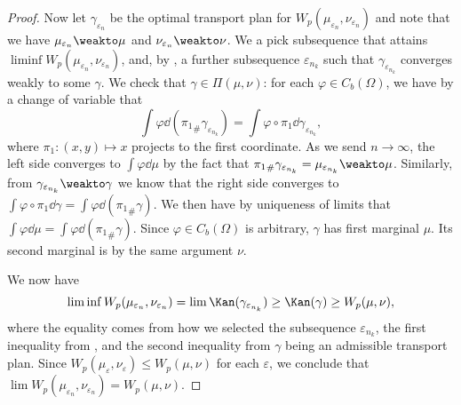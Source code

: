 \documentclass[oneside,reqno,letterpaper]{amsart}
\begin{document}
\begin{proof}
  Now let \(\gamma_{\varepsilon_n}\) be the optimal transport plan for \(W_p(\mu_{\varepsilon_n}, \nu_{\varepsilon_n})\) and note that we have \(\mu_{\varepsilon_n} \weakto \mu\) and \(\nu_{\varepsilon_n} \weakto \nu\).
  We a pick subsequence that attains \(\liminf W_p(\mu_{\varepsilon_n}, \nu_{\varepsilon_n})\), and, by , a further subsequence \(\varepsilon_{n_k}\) such that \(\gamma_{\varepsilon_{n_k}}\) converges weakly to some \(\gamma\).
  We check that \(\gamma \in \Pi(\mu, \nu)\):
  for each \(\varphi \in C_b(\Omega)\), we have by a change of variable that
  \[
    \int \varphi \dd ({\pi_1}_{\#} \gamma_{\varepsilon_{n_k}})
    = \int \varphi \circ \pi_1 \dd \gamma_{\varepsilon_{n_k}},
  \]
  where \(\pi_1: (x, y) \mapsto x\) projects to the first coordinate.
  As we send \(n \to \infty\), the left side converges to \(\int \varphi \dd \mu\) by the fact that \({\pi_1}_{\#} \gamma_{\varepsilon_{n_k}} = \mu_{\varepsilon_{n_k}} \weakto \mu\).
  Similarly, from \(\gamma_{\varepsilon_{n_k}} \weakto \gamma\) we know that the right side converges to \(\int \varphi \circ \pi_1 \dd \gamma = \int \varphi \dd ({\pi_1}_{\#} \gamma)\).
  We then have by uniqueness of limits that \(\int \varphi \dd \mu = \int \varphi \dd ({\pi_1}_{\#} \gamma)\).
  Since \(\varphi \in C_b(\Omega)\) is arbitrary, \(\gamma\) has first marginal \(\mu\).
  Its second marginal is by the same argument \(\nu\).

  We now have
  \[
    \liminf W_p(\mu_{\varepsilon_n}, \nu_{\varepsilon_n})
    = \lim \Kan(\gamma_{\varepsilon_{n_k}})
    \geq \Kan(\gamma) \geq W_p(\mu, \nu),
  \]
  where the equality comes from how we selected the subsequence \(\varepsilon_{n_k}\), the first inequality from , and the second inequality from \(\gamma\) being an admissible transport plan.
  Since \(W_p(\mu_{\varepsilon}, \nu_{\varepsilon}) \leq W_p(\mu, \nu)\) for each \(\varepsilon\), we conclude that \(\lim W_p(\mu_{\varepsilon_n}, \nu_{\varepsilon_n}) = W_p(\mu, \nu)\).
\end{proof}
\end{document}
